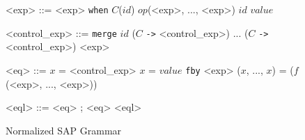 \begin{figure}
\begin{grammar}
<exp> ::= <exp> \verb|when| $C$($id$)
\alt $op$(<exp>, ..., <exp>)
\alt $id$
\alt $value$

<control_exp> ::=
\verb|merge| $id$ ($C$ \verb|->| <control_exp>) ... ($C$ \verb|->| <control_exp>)
\alt <exp>

<eq> ::= $x$ = <control_exp>
\alt $x$ = $value$ \verb|fby| <exp>
\alt ($x$, ..., $x$) = ($f$(<exp>, ..., <exp>))

<eql> ::= <eq> ; <eq> \alt <eql>

\end{grammar}
\hrulefill
\caption{Normalized SAP Grammar}
\label{NsapGrammar}
\end{figure}